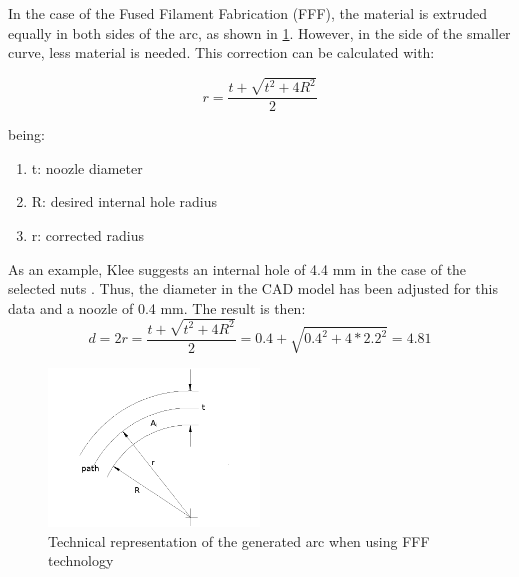   In the case of the Fused Filament Fabrication (FFF), the material is extruded equally in both sides of the arc, as shown in \ref{fig:arc_compensation}. 
  However, in the side of the smaller curve, less material is needed.
  This correction can be calculated with:

  $$ r=\frac{t+\sqrt{t^2+4R^2}}{2}$$

  being:
  \begin{enumerate}
    \item t: noozle diameter
    \item R: desired internal hole radius
    \item r: corrected radius
  \end{enumerate}
  As an example, Klee suggests an internal hole of 4.4 mm in the case of the selected nuts \cite{klee}. Thus, the diameter in the CAD model has been adjusted for this data and a noozle of 0.4 mm. The result is then:
  $$ d=2r=\frac{t+\sqrt{t^2+4R^2}}{2}=0.4+\sqrt{0.4^2+4*2.2^2}=4.81$$

  \begin{figure}[tb]
    \centering
    \includegraphics[width=0.5\textwidth]{figures/Arc-compensation}
    \caption{Technical representation of the generated arc when using FFF technology}
    \label{fig:arc_compensation}
  \end{figure}

